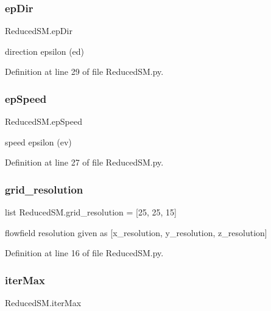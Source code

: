 \subsubsection{\texorpdfstring{ep\+Dir}{epDir}}
{\footnotesize\ttfamily Reduced\+S\+M.\+ep\+Dir}



direction epsilon (ed) 



Definition at line 29 of file Reduced\+S\+M.\+py.

\mbox{\label{namespace_reduced_s_m_aa4f3b7b9255fe90c846c6e42d57ab5f1}} 
\subsubsection{\texorpdfstring{ep\+Speed}{epSpeed}}
{\footnotesize\ttfamily Reduced\+S\+M.\+ep\+Speed}



speed epsilon (ev) 



Definition at line 27 of file Reduced\+S\+M.\+py.

\mbox{\label{namespace_reduced_s_m_ac73e3bc6b17648d508dd822d76929524}} 
\subsubsection{\texorpdfstring{grid\+\_\+resolution}{grid\_resolution}}
{\footnotesize\ttfamily list Reduced\+S\+M.\+grid\+\_\+resolution = \mbox{[}25, 25, 15\mbox{]}}



flowfield resolution given as \mbox{[}x\+\_\+resolution, y\+\_\+resolution, z\+\_\+resolution\mbox{]} 



Definition at line 16 of file Reduced\+S\+M.\+py.

\mbox{\label{namespace_reduced_s_m_aef5d3f10407f244dce4feddcf7947ed3}} 
\subsubsection{\texorpdfstring{iter\+Max}{iterMax}}
{\footnotesize\ttfamily Reduced\+S\+M.\+iter\+Max}



